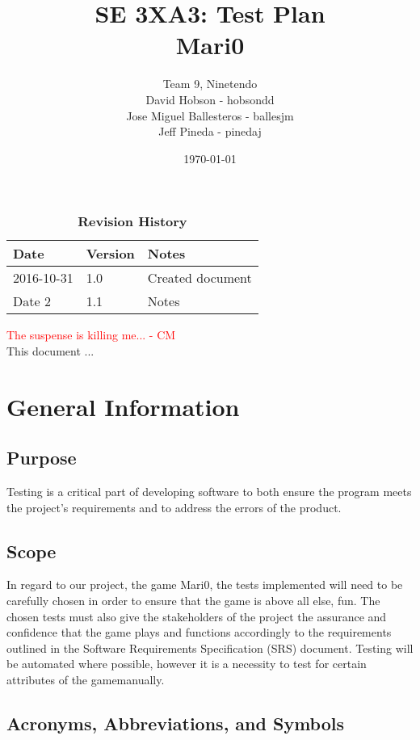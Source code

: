 \documentclass[12pt, titlepage]{article}
\title{SE 3XA3: Test Plan\\Mari0}
\author{Team 9, Ninetendo
		\\ David Hobson - hobsondd
		\\ Jose Miguel Ballesteros - ballesjm
		\\ Jeff Pineda - pinedaj
}
\date{\today}
\begin{document}
\maketitle

\tableofcontents
\listoftables
\listoffigures

\begin{table}[bp]
\caption{\bf Revision History}
\begin{tabularx}{\textwidth}{p{3cm}p{2cm}X}
\toprule {\bf Date} & {\bf Version} & {\bf Notes}\\
\midrule
2016-10-31 & 1.0 & Created document\\
Date 2 & 1.1 & Notes\\
\bottomrule
\end{tabularx}
\end{table}

\newpage

\textcolor{red}{The suspense is killing me... - CM} \\
This document ...

\section{General Information}

\subsection{Purpose}
Testing is a critical part of developing software to both ensure the program meets the project's requirements and to address the errors of the product. 
\subsection{Scope}
In regard to our project, the game Mari0, the tests implemented will need to be carefully chosen in order to ensure that the game is above all else, fun. The chosen tests must also give the stakeholders of the project the assurance and confidence that the game plays and functions accordingly to the requirements outlined in the Software Requirements Specification (SRS) document. Testing will be automated where possible, however it is a necessity to test for certain attributes of the gamemanually.
\subsection{Acronyms, Abbreviations, and Symbols}
	
\end{document}
